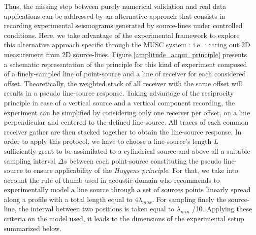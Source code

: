 \documentclass[manuscript,revised]{geophysics}
\begin{document}
\noindent Thus, the missing step between purely numerical validation and real data applications can be addressed by an alternative approach that consists in recording experimental seismograms generated by source-lines under controlled conditions. Here, we take advantage of the experimental framework to explore this alternative approach specific through the MUSC system : i.e. : caring out 2D measurement from 2D source-lines. Figure \ref{amplitude_acqui_principle} presents a schematic representation of the principle for this kind of experiment composed of a finely-sampled line of point-source and a line of receiver for each considered offset. Theoretically, the weighted stack of all receiver with the same offset will results in a pseudo line-source response. Taking advantage of the reciprocity principle in case of a vertical source and a vertical component recording, the experiment can be simplified by considering only one receiver per offset, on a line perpendicular and centered to the defined line-source. All traces of each common receiver gather are then stacked together to obtain the line-source response. In order to apply this protocol, we have to choose a line-source's length $L$ sufficiently great to be assimilated to a cylindrical source and above all a suitable sampling interval $\Delta s$ between each point-source constituting the pseudo line-source to ensure applicability of the \textit{Huygens principle}. For that, we take into account the rule of thumb used in acoustic domain who recommends to experimentally model a line source through a set of sources points linearly spread along a profile with a total length equal to 4$\lambda_{max}$. For sampling finely the source-line, the interval between two positions is taken equal to  $\lambda_{min}$ /10. Applying these criteria on the model used, it leads to the dimensions of the experimental setup summarized below. 
\end{document}
